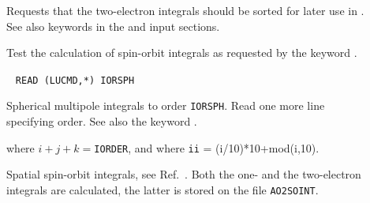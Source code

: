 \begin{description}
\item[] Requests that the
two-electron integrals should be
sorted for later use in \sir . See also keywords  in the
 and  input sections.

\item[] Test the calculation of spin-orbit integrals as
requested by the keyword .

\item[]\verb| |\newline
\verb|READ (LUCMD,*) IORSPH|

Spherical multipole integrals to order
\verb|IORSPH|. Read one more
line specifying order. See also the keyword .

where $i+j+k =$\verb|IORDER|, and where \verb|ii| = (i/10)*10+mod(i,10).

\item[] Spatial spin-orbit
integrals, see Ref.~\cite{ovhapjhjajthjojcp96}. Both the one- and the
two-electron integrals are calculated, the latter is stored on the file
\verb|AO2SOINT|.


%


\end{description}
